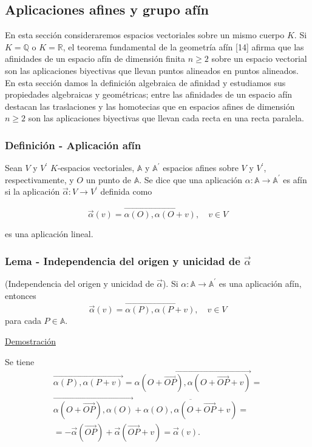 \documentclass[12pt, a4paper, ones, notitlepage, openany,titlepage]{article}
\newcommand{\demostracion}{\noindent\underline{Demostración}}
\begin{document}
\subsection{Aplicaciones afines y grupo afín}
En esta sección consideraremos espacios vectoriales sobre un mismo cuerpo $K$. Si $K=\mathbb{Q}$ o $K=\mathbb{R}$, el teorema fundamental de la geometría afín [14] afirma que las afinidades de un espacio afín de dimensión finita $n \geq 2$ sobre un espacio vectorial son las aplicaciones biyectivas que llevan puntos alineados en puntos alineados. En esta sección damos la definición algebraica de afinidad y estudiamos sus propiedades algebraicas y geométricas; entre las afinidades de un espacio afín destacan las traslaciones y las homotecias que en espacios afines de dimensión $n \geq 2$ son las aplicaciones biyectivas que llevan cada recta en una recta paralela.

\subsubsection{Definición - Aplicación afín}
Sean $V$ y $V^{\prime}$ $K$-espacios vectoriales, $\mathbb{A}$ y $\mathbb{A}^{\prime}$ espacios afines sobre $V$ y $V^{\prime}$, respectivamente, y $O$ un punto de $\mathbb{A}$. Se dice que una aplicación $\alpha: \mathbb{A} \rightarrow \mathbb{A}^{\prime}$ es afín si la aplicación $\vec{\alpha}: V \rightarrow V^{\prime}$ definida como

$$
\vec{\alpha}(v)=\overrightarrow{\alpha(O), \alpha(O+v)}, \quad v \in V
$$

\noindent es una aplicación lineal.

\subsubsection{Lema - Independencia del origen y unicidad de $\overrightarrow{\alpha}$}
\noindent (Independencia del origen y unicidad de $\overrightarrow{\alpha}$). Si $\alpha: \mathbb{A} \rightarrow \mathbb{A}^{\prime}$ es una aplicación afín, entonces
$$
\vec{\alpha}(v)=\overrightarrow{\alpha(P), \alpha(P+v)}, \quad v \in V
$$
para cada $P \in \mathbb{A}$.

\demostracion

\noindent Se tiene
\begin{gather*}
\overrightarrow{\alpha(P), \alpha(P+v)} =\overrightarrow{\alpha(O+\overrightarrow{O P}), \alpha(O+\overrightarrow{O P}+v)}=\\\overrightarrow{\alpha(O+\overrightarrow{O P}), \alpha(O)}+\overline{\alpha(O), \alpha(O+\overrightarrow{O P}+v)} = \\ =-\vec{\alpha}(\overrightarrow{O P})+\vec{\alpha}(\overrightarrow{O P}+v)=\vec{\alpha}(v).
\end{gather*}
\end{document}

